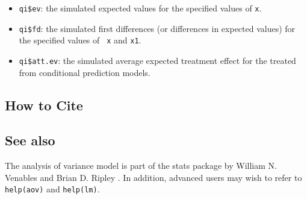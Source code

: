 \begin{itemize}
   \begin{itemize}
   \item {\tt qi\$ev}: the simulated expected values for the specified
     values of {\tt x}.
   \item {\tt qi\$fd}:  the simulated first differences (or
     differences in expected values) for the specified values of {\tt
       x} and {\tt x1}. 
   \item {\tt qi\$att.ev}: the simulated average expected treatment
     effect for the treated from conditional prediction models.  
   \end{itemize}
\end{itemize}


\subsection* {How to Cite} 



\subsection* {See also}
The analysis of variance model is part of the stats package by William
N. Venables and Brian D. Ripley \citep{VenRip02}.  In addition,
advanced users may wish to refer to \texttt{help(aov)} and
\texttt{help(lm)}. 
